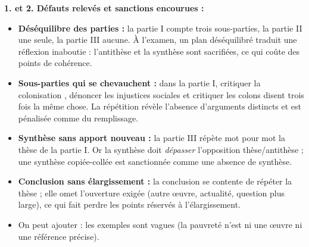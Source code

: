 \documentclass[11pt]{article}
\begin{document}
\begin{corrige}
\textbf{1. et 2. Défauts relevés et sanctions encourues :}
\begin{itemize}
\item \textbf{Déséquilibre des parties :} la partie I compte trois sous-parties, la partie II une seule, la partie III aucune. À l'examen, un plan déséquilibré traduit une réflexion inaboutie : l'antithèse et la synthèse sont sacrifiées, ce qui coûte des points de cohérence.
\item \textbf{Sous-parties qui se chevauchent :} dans la partie I, \og critiquer la colonisation \fg{}, \og dénoncer les injustices sociales \fg{} et \og critiquer les colons \fg{} disent trois fois la même chose. La répétition révèle l'absence d'arguments distincts et est pénalisée comme du remplissage.
\item \textbf{Synthèse sans apport nouveau :} la partie III répète mot pour mot la thèse de la partie I. Or la synthèse doit \emph{dépasser} l'opposition thèse/antithèse ; une synthèse copiée-collée est sanctionnée comme une absence de synthèse.
\item \textbf{Conclusion sans élargissement :} la conclusion se contente de répéter la thèse ; elle omet l'ouverture exigée (autre œuvre, actualité, question plus large), ce qui fait perdre les points réservés à l'élargissement.
\item On peut ajouter : les exemples sont vagues (\og la pauvreté \fg{} n'est ni une œuvre ni une référence précise).
\end{itemize}


\end{corrige}
\end{document}
